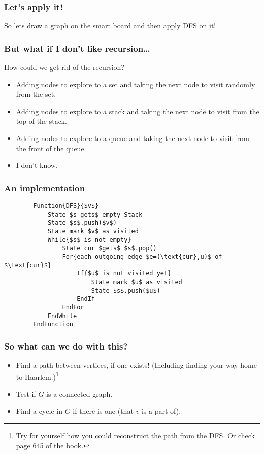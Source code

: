 \begin{frame}
	\frametitle{Let's apply it!}

		So lets draw a graph on the smart board and then apply DFS on it!
\end{frame}

\begin{frame}
	\frametitle{But what if I don't like recursion\dots}

		How could we get rid of the recursion?
		\begin{itemize}
			\item Adding nodes to explore to a set and taking the next node to visit randomly from the set.
			\item Adding nodes to explore to a stack and taking the next node to visit from the top of the stack.
			\item Adding nodes to explore to a queue and taking the next node to visit from the front of the queue.
			\item I don't know.
		\end{itemize}
\end{frame}

\begin{frame}[fragile]
	\frametitle{An implementation}
	
	\begin{lstlisting}
		Function{DFS}{$v$}
			State $s gets$ empty Stack
			State $s$.push($v$)
			State mark $v$ as visited
			While{$s$ is not empty}
				State cur $gets$ $s$.pop()
				For{each outgoing edge $e=(\text{cur},u)$ of $\text{cur}$}
					If{$u$ is not visited yet}
						State mark $u$ as visited
						State $s$.push($u$)
					EndIf
				EndFor
			EndWhile
		EndFunction
	\end{lstlisting}
\end{frame}

\begin{frame}
	\frametitle{So what can we do with this?}

			\begin{itemize}
				\item Find a path between vertices, if one exists! (Including finding your way home to Haarlem.)\footnote{Try for
					yourself how you could reconstruct the path from the DFS. Or check page 645 of the book.}
					
				\item Test if $G$ is a connected graph.
					
				\item Find a cycle in $G$ if there is one (that $v$ is a part of).
			\end{itemize}
			
\end{frame}

